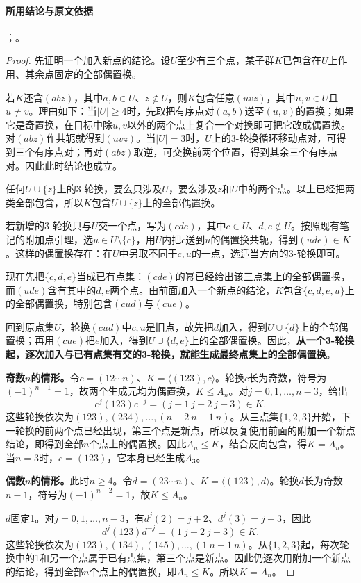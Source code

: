 \paragraph{所用结论与原文依据}
；。


\begin{proof}
先证明一个加入新点的结论。设$U$至少有三个点，某子群$K$已包含在$U$上作用、其余点固定的全部偶置换。

若$K$还含$(abz)$，其中$a,b\in U$、$z\notin U$，则$K$包含任意$(uvz)$，其中$u,v\in U$且$u\ne v$。理由如下：当$|U|\ge4$时，先取把有序点对$(a,b)$送至$(u,v)$的置换；如果它是奇置换，在目标中除$u,v$以外的两个点上复合一个对换即可把它改成偶置换。对$(abz)$作共轭就得到$(uvz)$。当$|U|=3$时，$U$上的3-轮换循环移动点对，可得到三个有序点对；再对$(abz)$取逆，可交换前两个位置，得到其余三个有序点对。因此此时结论也成立。

任何$U\cup\{z\}$上的3-轮换，要么只涉及$U$，要么涉及$z$和$U$中的两个点。以上已经把两类全部包含，所以$K$包含$U\cup\{z\}$上的全部偶置换。

若新增的3-轮换只与$U$交一个点，写为$(cde)$，其中$c\in U$、$d,e\notin U$。按照现有笔记的附加点引理，选$u\in U\setminus\{c\}$，用$U$内把$c$送到$u$的偶置换共轭，得到$(ude)\in K$。这样的偶置换存在：在$U$中另取不同于$c,u$的一点，选适当方向的3-轮换即可。

现在先把$\{c,d,e\}$当成已有点集：$(cde)$的幂已经给出该三点集上的全部偶置换，而$(ude)$含有其中的$d,e$两个点。由前面加入一个新点的结论，$K$包含$\{c,d,e,u\}$上的全部偶置换，特别包含$(cud)$与$(cue)$。

回到原点集$U$，轮换$(cud)$中$c,u$是旧点，故先把$d$加入，得到$U\cup\{d\}$上的全部偶置换；再用$(cue)$把$e$加入，得到$U\cup\{d,e\}$上的全部偶置换。因此，\textbf{从一个3-轮换起，逐次加入与已有点集有交的3-轮换，就能生成最终点集上的全部偶置换}。

\textbf{奇数$n$的情形。}令$c=(12\cdots n)$、$K=\langle(123),c\rangle$。轮换$c$长为奇数，符号为$(-1)^{n-1}=1$，故两个生成元均为偶置换，$K\le A_n$。对$j=0,1,\ldots,n-3$，给出
\[
c^j(123)c^{-j}=(j+1\ j+2\ j+3)\in K.
\]
这些轮换依次为$(123),(234),\ldots,(n-2\ n-1\ n)$。从三点集$\{1,2,3\}$开始，下一轮换的前两个点已经出现，第三个点是新点，所以反复使用前面的附加一个新点结论，即得到全部$n$个点上的偶置换。因此$A_n\le K$，结合反向包含，得$K=A_n$。当$n=3$时，$c=(123)$，它本身已经生成$A_3$。

\textbf{偶数$n$的情形。}此时$n\ge4$。令$d=(23\cdots n)$、$K=\langle(123),d\rangle$。轮换$d$长为奇数$n-1$，符号为$(-1)^{n-2}=1$，故$K\le A_n$。

$d$固定1。对$j=0,1,\ldots,n-3$，有$d^j(2)=j+2$、$d^j(3)=j+3$，因此
\[
d^j(123)d^{-j}=(1\ j+2\ j+3)\in K.
\]
这些轮换依次为$(123),(134),(145),\ldots,(1\ n-1\ n)$。从$\{1,2,3\}$起，每次轮换中的1和另一个点属于已有点集，第三个点是新点。因此仍逐次用附加一个新点的结论，得到全部$n$个点上的偶置换，即$A_n\le K$。所以$K=A_n$。
\end{proof}

